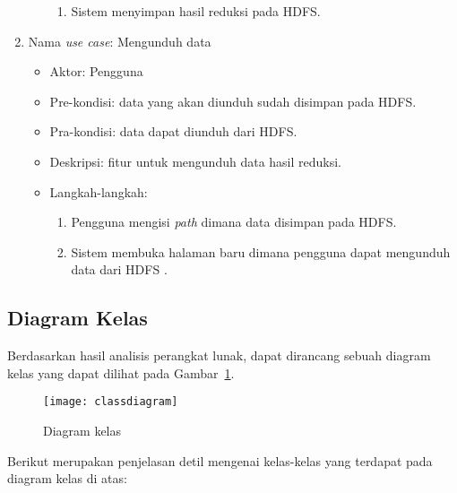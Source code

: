 \begin{enumerate}
\begin{itemize}
\begin{enumerate}
\item Sistem menyimpan hasil reduksi pada HDFS.
\end{enumerate}

\end{itemize}


\item Nama \textit{use case}: Mengunduh data

\begin{itemize}
\item Aktor: Pengguna

\item Pre-kondisi: data yang akan diunduh sudah disimpan pada HDFS.

\item Pra-kondisi: data dapat diunduh dari HDFS.

\item Deskripsi: fitur untuk mengunduh data hasil reduksi.

\item Langkah-langkah:

\begin{enumerate}

\item Pengguna mengisi \textit{path} dimana data disimpan pada HDFS.

\item Sistem membuka halaman baru dimana pengguna dapat mengunduh data dari HDFS .

\end{enumerate}

\end{itemize}

\end{enumerate}


\subsection{Diagram Kelas}

Berdasarkan hasil analisis perangkat lunak, dapat dirancang sebuah diagram kelas yang dapat dilihat pada Gambar~\ref{fig:classdiagram}.

\begin{figure}[H]
    \centering  
    \texttt{[image: classdiagram]}  
    \caption[Diagram kelas]{Diagram kelas} 
    \label{fig:classdiagram} 
\end{figure}

Berikut merupakan penjelasan detil mengenai kelas-kelas yang terdapat pada diagram kelas di atas:

